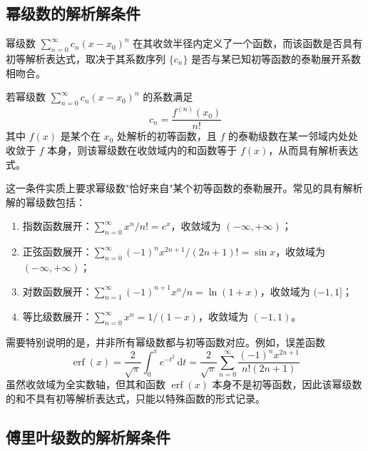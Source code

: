 \subsection{幂级数的解析解条件}

幂级数 $\displaystyle \sum_{n=0}^{\infty} c_n (x - x_0)^n$ 在其收敛半径内定义了一个函数，而该函数是否具有初等解析表达式，取决于其系数序列 $\{c_n\}$ 是否与某已知初等函数的泰勒展开系数相吻合。

\begin{theorem}[幂级数解析性条件]
若幂级数 $\displaystyle \sum_{n=0}^{\infty} c_n (x - x_0)^n$ 的系数满足
\begin{equation}
c_n = \frac{f^{(n)}(x_0)}{n!}
\end{equation}
其中 $f(x)$ 是某个在 $x_0$ 处解析的初等函数，且 $f$ 的泰勒级数在某一邻域内处处收敛于 $f$ 本身，则该幂级数在收敛域内的和函数等于 $f(x)$，从而具有解析表达式。
\end{theorem}

这一条件实质上要求幂级数"恰好来自"某个初等函数的泰勒展开。常见的具有解析解的幂级数包括：
\begin{enumerate}[label=（\arabic*）]
  \item 指数函数展开：$\displaystyle \sum_{n=0}^{\infty} x^n/n! = e^x$，收敛域为 $(-\infty, +\infty)$；
  \item 正弦函数展开：$\displaystyle \sum_{n=0}^{\infty} (-1)^n x^{2n+1}/(2n+1)! = \sin x$，收敛域为 $(-\infty, +\infty)$；
  \item 对数函数展开：$\displaystyle \sum_{n=1}^{\infty} (-1)^{n+1} x^n/n = \ln(1+x)$，收敛域为 $(-1, 1]$；
  \item 等比级数展开：$\displaystyle \sum_{n=0}^{\infty} x^n = 1/(1-x)$，收敛域为 $(-1, 1)$。
\end{enumerate}

需要特别说明的是，并非所有幂级数都与初等函数对应。例如，误差函数
\begin{equation}
\operatorname{erf}(x) = \frac{2}{\sqrt{\pi}}\int_0^x e^{-t^2}\, \mathrm{d}t = \frac{2}{\sqrt{\pi}} \sum_{n=0}^{\infty} \frac{(-1)^n x^{2n+1}}{n!(2n+1)}
\end{equation}
虽然收敛域为全实数轴，但其和函数 $\operatorname{erf}(x)$ 本身不是初等函数，因此该幂级数的和不具有初等解析表达式，只能以特殊函数的形式记录。

\subsection{傅里叶级数的解析解条件}

